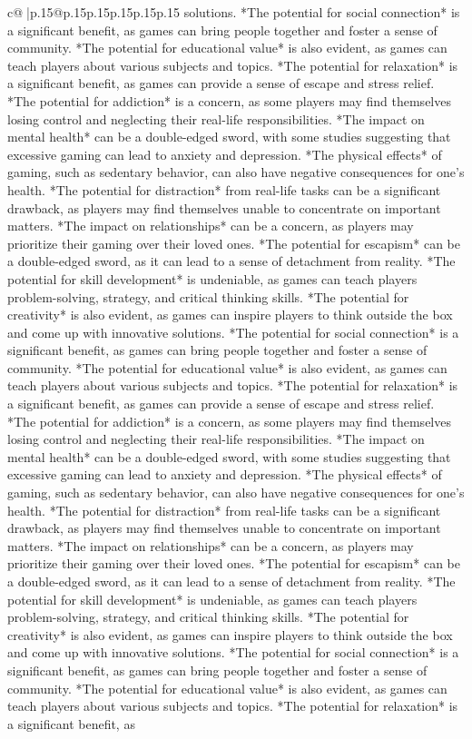 \documentclass{article}
\begin{document}
{\begin{supertabular}{c@{$\;$}|p{.15\linewidth}@{}p{.15\linewidth}p{.15\linewidth}p{.15\linewidth}p{.15\linewidth}p{.15\linewidth}}
{{{solutions. *The potential for social connection* is a significant benefit, as games can bring people together and foster a sense of community. *The potential for educational value* is also evident, as games can teach players about various subjects and topics. *The potential for relaxation* is a significant benefit, as games can provide a sense of escape and stress relief. *The potential for addiction* is a concern, as some players may find themselves losing control and neglecting their real{-}life responsibilities. *The impact on mental health* can be a double{-}edged sword, with some studies suggesting that excessive gaming can lead to anxiety and depression. *The physical effects* of gaming, such as sedentary behavior, can also have negative consequences for one's health. *The potential for distraction* from real{-}life tasks can be a significant drawback, as players may find themselves unable to concentrate on important matters. *The impact on relationships* can be a concern, as players may prioritize their gaming over their loved ones. *The potential for escapism* can be a double{-}edged sword, as it can lead to a sense of detachment from reality. *The potential for skill development* is undeniable, as games can teach players problem{-}solving, strategy, and critical thinking skills. *The potential for creativity* is also evident, as games can inspire players to think outside the box and come up with innovative solutions. *The potential for social connection* is a significant benefit, as games can bring people together and foster a sense of community. *The potential for educational value* is also evident, as games can teach players about various subjects and topics. *The potential for relaxation* is a significant benefit, as games can provide a sense of escape and stress relief. *The potential for addiction* is a concern, as some players may find themselves losing control and neglecting their real{-}life responsibilities. *The impact on mental health* can be a double{-}edged sword, with some studies suggesting that excessive gaming can lead to anxiety and depression. *The physical effects* of gaming, such as sedentary behavior, can also have negative consequences for one's health. *The potential for distraction* from real{-}life tasks can be a significant drawback, as players may find themselves unable to concentrate on important matters. *The impact on relationships* can be a concern, as players may prioritize their gaming over their loved ones. *The potential for escapism* can be a double{-}edged sword, as it can lead to a sense of detachment from reality. *The potential for skill development* is undeniable, as games can teach players problem{-}solving, strategy, and critical thinking skills. *The potential for creativity* is also evident, as games can inspire players to think outside the box and come up with innovative solutions. *The potential for social connection* is a significant benefit, as games can bring people together and foster a sense of community. *The potential for educational value* is also evident, as games can teach players about various subjects and topics. *The potential for relaxation* is a significant benefit, as }}}
\end{supertabular}}
\end{document}
